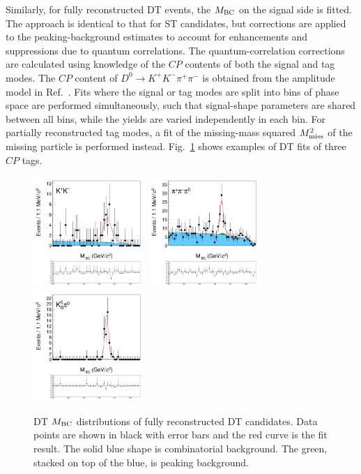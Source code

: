 \documentclass[12pt, a4paper, notitlepage, onecolumn]{article}
\begin{document}
Similarly, for fully reconstructed DT events, the $M_{\rm BC}$ on the signal side is fitted. The approach is identical to that for ST candidates, but corrections are applied to the peaking-background estimates to account for enhancements and suppressions due to quantum correlations. The quantum-correlation corrections are calculated using knowledge of the $C\!P$ contents of both the signal and tag modes. The $C\!P$ content of $D^0\to K^+K^-\pi^+\pi^-$ is obtained from the amplitude model in Ref.~\cite{LHCb-PAPER-2018-041}. Fits where the signal or tag modes are split into bins of phase space are performed simultaneously, such that signal-shape parameters are shared between all bins, while the yields are varied independently in each bin. For partially reconstructed tag modes, a fit of the missing-mass squared $M_{\rm miss}^2$ of the missing particle is performed instead. Fig.~\ref{figure:DT_MBC} shows examples of DT fits of three $C\!P$ tags.

\begin{figure}[htb]
    \centering
    \includegraphics[height=4.2cm,trim={1.0cm 13.5cm 2.5cm 1.5cm},clip]{Plots/DoubleTagYield_DoubleTag_CP_KKpipi_vs_KK_SignalBin0.png}
    \includegraphics[height=4.2cm,trim={5.5cm 13.5cm 2.5cm 1.5cm},clip]{Plots/DoubleTagYield_DoubleTag_CP_KKpipi_vs_pipipi0_SignalBin0.png}
    \includegraphics[height=4.2cm,trim={5.5cm 13.5cm 2.5cm 1.5cm},clip]{Plots/DoubleTagYield_DoubleTag_CP_KKpipi_vs_KSpi0_SignalBin0.png}
    \caption{DT $M_{\rm BC}$ distributions of fully reconstructed DT candidates. Data points are shown in black with error bars and the red curve is the fit result. The solid blue shape is combinatorial background. The green, stacked on top of the blue, is peaking background.}
    \label{figure:DT_MBC}
\end{figure}
\end{document}
